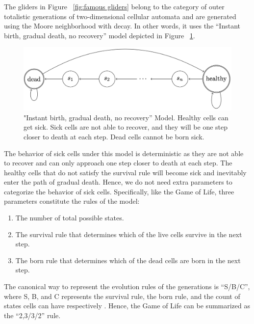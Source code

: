 \documentclass[12pt]{article}
\numberwithin{figure}{section} %
\begin{document}
The gliders in Figure ~\ref{fig:famous gliders} belong to the category of outer totalistic generations of two-dimensional cellular automata and are generated using the Moore neighborhood with decay. In other words, it uses the “Instant birth, gradual death, no recovery” model depicted in Figure ~\ref{fig:IGN model}. 

\begin{figure}[H]
	\centering
	\includegraphics[width=\linewidth]{Section1/9}
	\caption["Instant birth, gradual death, no recovery” Model]{"Instant birth, gradual death, no recovery” Model. Healthy cells can get sick. Sick cells are not able to recover, and they will be one step closer to death at each step. Dead cells cannot be born sick.}
	\label{fig:IGN model}
	\vspace{-1.5em}
\end{figure}

The behavior of sick cells under this model is deterministic as they are not able to recover and can only approach one step closer to death at each step. The healthy cells that do not satisfy the survival rule will become sick and inevitably enter the path of gradual death. Hence, we do not need extra parameters to categorize the behavior of sick cells. Specifically, like the Game of Life,  three parameters constitute the rules of the model: 
\begin{enumerate}[topsep=0pt,itemsep=-1ex,partopsep=1ex,parsep=1ex]
\item The number of total possible states. 
\item The survival rule that determines which of the live cells survive in the next step. 
\item The born rule that determines which of the dead cells are born in the next step. 
\end{enumerate}
The canonical way to represent the evolution rules of the generations is “S/B/C”, where S, B, and C represents the survival rule, the born rule, and the count of states cells can have respectively \cite{Lexicon}. Hence, the Game of Life can be summarized as the “2,3/3/2” rule.
\end{document}
